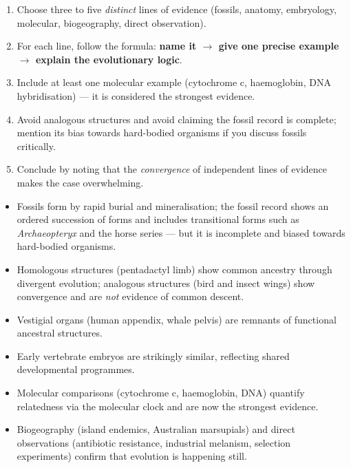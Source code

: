 \documentclass[11pt]{article}
\begin{document}
\begin{methode}
\begin{enumerate}
\item Choose three to five \emph{distinct} lines of evidence (fossils, anatomy, embryology, molecular, biogeography, direct observation).
\item For each line, follow the formula: \textbf{name it $\rightarrow$ give one precise example $\rightarrow$ explain the evolutionary logic}.
\item Include at least one molecular example (cytochrome c, haemoglobin, DNA hybridisation) — it is considered the strongest evidence.
\item Avoid analogous structures and avoid claiming the fossil record is complete; mention its bias towards hard-bodied organisms if you discuss fossils critically.
\item Conclude by noting that the \emph{convergence} of independent lines of evidence makes the case overwhelming.
\end{enumerate}
\end{methode}

\begin{aretenir}
\begin{itemize}
\item Fossils form by rapid burial and mineralisation; the fossil record shows an ordered succession of forms and includes transitional forms such as \emph{Archaeopteryx} and the horse series — but it is incomplete and biased towards hard-bodied organisms.
\item Homologous structures (pentadactyl limb) show common ancestry through divergent evolution; analogous structures (bird and insect wings) show convergence and are \emph{not} evidence of common descent.
\item Vestigial organs (human appendix, whale pelvis) are remnants of functional ancestral structures.
\item Early vertebrate embryos are strikingly similar, reflecting shared developmental programmes.
\item Molecular comparisons (cytochrome c, haemoglobin, DNA) quantify relatedness via the molecular clock and are now the strongest evidence.
\item Biogeography (island endemics, Australian marsupials) and direct observations (antibiotic resistance, industrial melanism, selection experiments) confirm that evolution is happening still.
\end{itemize}
\end{aretenir}
\end{document}
